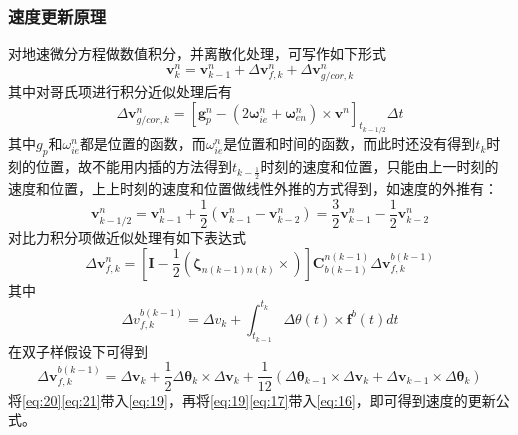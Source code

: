 \documentclass{ctexart}
\begin{document}
\subsubsection{速度更新原理}
对地速微分方程做数值积分，并离散化处理，可写作如下形式
\begin{equation}
\boldsymbol{v}_{k}^{n}=\boldsymbol{v}_{k-1}^{n}+\Delta \boldsymbol{v}_{f, k}^{n}+\Delta \boldsymbol{v}_{g / c o r, k}^{n}
\label{eq:16}
\end{equation}
其中对哥氏项进行积分近似处理后有
\begin{equation}
\Delta \boldsymbol{v}_{g / c o r, k}^{n}=\left[\boldsymbol{g}_{p}^{n}-\left(2 \boldsymbol{\omega}_{i e}^{n}+\boldsymbol{\omega}_{e n}^{n}\right) \times \boldsymbol{v}^{n}\right]_{t_{k-1 / 2}} \Delta t
\label{eq:17}
\end{equation}
其中$g_p$和$\omega^n_{ie}$都是位置的函数，而$\omega^n_{ie}$是位置和时间的函数，而此时还没有得到$t_k$时刻的位置，故不能用内插的方法得到$t_{k-\frac{1}{2}}$时刻的速度和位置，只能由上一时刻的速度和位置，上上时刻的速度和位置做线性外推的方式得到，如速度的外推有：
\begin{equation}
\boldsymbol{v}_{k-1 / 2}^{n}=\boldsymbol{v}_{k-1}^{n}+\frac{1}{2}\left(\boldsymbol{v}_{k-1}^{n}-\boldsymbol{v}_{k-2}^{n}\right)=\frac{3}{2} \boldsymbol{v}_{k-1}^{n}-\frac{1}{2} \boldsymbol{v}_{k-2}^{n}
\end{equation}
对比力积分项做近似处理有如下表达式
\begin{equation}
\Delta \boldsymbol{v}_{f, k}^{n}=\left[\mathbf{I}-\frac{1}{2}\left(\boldsymbol{\zeta}_{n(k-1) n(k)} \times\right)\right] \mathbf{C}_{b(k-1)}^{n(k-1)} \Delta \boldsymbol{v}_{f, k}^{b(k-1)}
\label{eq:19}
\end{equation}
其中
\begin{equation}
\Delta v^{b(k-1)}_{f,k}=\Delta v_k+\int^{t_k}_{t_{k-1}}\Delta\theta(t)\times\mathbf{f}^b(t)dt
\label{eq:20}
\end{equation}
在双子样假设下可得到
\begin{equation}
\Delta \boldsymbol{v}_{f, k}^{b(k-1)}=\Delta \boldsymbol{v}_{k}+\frac{1}{2} \Delta \boldsymbol{\theta}_{k} \times \Delta \boldsymbol{v}_{k}+\frac{1}{12}\left(\Delta \boldsymbol{\theta}_{k-1} \times \Delta \boldsymbol{v}_{k}+\Delta \boldsymbol{v}_{k-1} \times \Delta \boldsymbol{\theta}_{k}\right)
\label{eq:21}
\end{equation}
将\eqref{eq:20}\eqref{eq:21}带入\eqref{eq:19}，再将\eqref{eq:19}\eqref{eq:17}带入\eqref{eq:16}，即可得到速度的更新公式。
\end{document}
